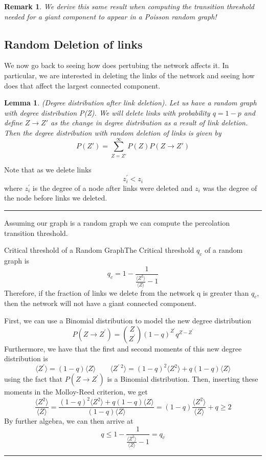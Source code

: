 \documentclass[twoside]{article}
\newtheorem{lemma}[theorem]{Lemma}
\newtheorem{remark}[theorem]{Remark}
\newenvironment{proof}{{\bf Proof:}}{\hfill\rule{2mm}{2mm}}
\begin{document}
\begin{remark} We derive this same result when computing the transition threshold needed for a giant component to appear in a Poisson random graph!
\end{remark}

\subsection{Random Deletion of links}

We now go back to seeing how does pertubing the network affects it. In particular, we are interested in deleting the links of the network and seeing how does that affect the largest connected component.


\begin{lemma}(Degree distribution after link deletion). Let us have a random graph with degree distribution P(Z). We will delete links with probability $q = 1 - p$ and define $Z \rightarrow Z'$ as the change in degree distribution as a result of link deletion. Then the degree distribution with random deletion of links is given by
$$
P(Z') = \sum_{Z = Z'}^{\infty}P(Z)P(Z \rightarrow Z')
$$
\end{lemma}

\begin{proof} Note that as we delete links 
$$
z_i^{'} < z_i
$$
where $z_i^{'}$ is the degree of a node after links were deleted and $z_i$ was the degree of the node before links we deleted.
\end{proof}

Assuming our graph is a random graph we can compute the percolation transition threshold.

\begin{proposition_exam}{Critical threshold of a Random Graph}{}The Critical  threshold $q_c$ of a random graph is 
$$
q_c = 1 - \frac{1}{\frac{\langle Z^2 \rangle}{\langle Z \rangle} - 1}
$$
Therefore, if the fraction of links we delete from the network q is greater than $q_c$, then the network will not have a giant connected component.
\end{proposition_exam}

\begin{proof} First, we can use a Binomial distribution to model the new degree distribution 
$$
P(Z \rightarrow Z^{'}) = {Z \choose Z^{'}}(1 - q)^{Z^{'}}q^{Z - Z^{'}}
$$
Furthermore, we have that the first and second moments of this new degree distribution is 
$$
\langle Z^{'} \rangle = (1 - q)\langle Z \rangle \quad \quad \langle Z^{'\;2} \rangle = (1 - q)^2\langle Z^2 \rangle + q(1 - q)\langle Z \rangle
$$
using the fact that $P(Z \rightarrow Z^{'})$ is a Binomial distribution. Then, inserting these moments in the Molloy-Reed criterion, we get 
$$
\frac{\langle Z^2 \rangle}{\langle Z \rangle} = \frac{(1 - q)^2\langle Z^2 \rangle + q(1 - q)\langle Z \rangle}{(1 - q)\langle Z \rangle} = (1 - q)\frac{\langle Z^2 \rangle}{\langle Z \rangle} + q \geq 2
$$
By further algebra, we can then arrive at 
$$
q \leq 1 - \frac{1}{\frac{\langle Z^2 \rangle}{\langle Z \rangle} - 1} = q_c
$$
\end{proof}
\end{document}

